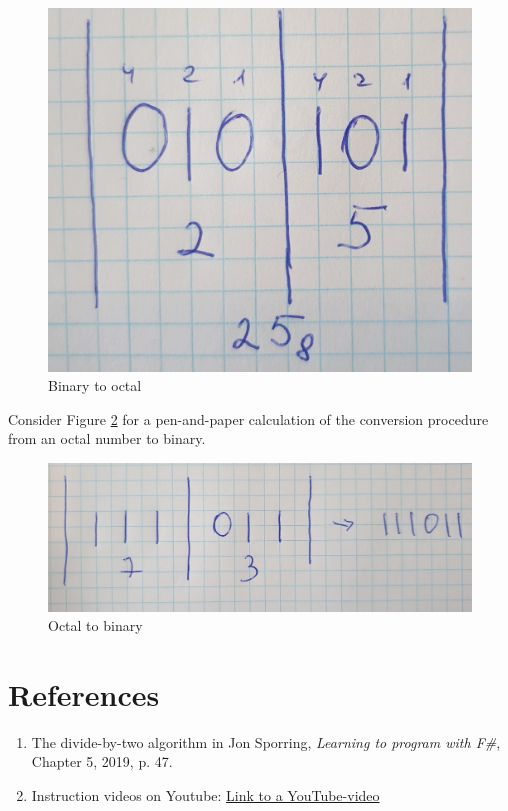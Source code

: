 \documentclass{article}
\begin{document}
\begin{figure}[h!]
  \centering
 \includegraphics[scale=0.1]{Binary_to_octal.jpg}
 \caption{Binary to octal}
 \label{output7}
\end{figure}
\newline
Consider Figure \ref{output8} for a pen-and-paper calculation of the conversion procedure from an octal number to binary.
\begin{figure}[h!]
  \centering
 \includegraphics[scale=0.1]{Octal_to_binary.jpg}
 \caption{Octal to binary}
 \label{output8}
\end{figure}

\section{References}
\begin{enumerate}
\item The divide-by-two algorithm in Jon Sporring, \emph{Learning to program with F\#}, Chapter 5, 2019, p. 47.
\item Instruction videos on Youtube: \href{https://www.youtube.com/watch?v=D_YC6DSPpQE}{Link to a YouTube-video}
  \end{enumerate}
  
\end{document}
